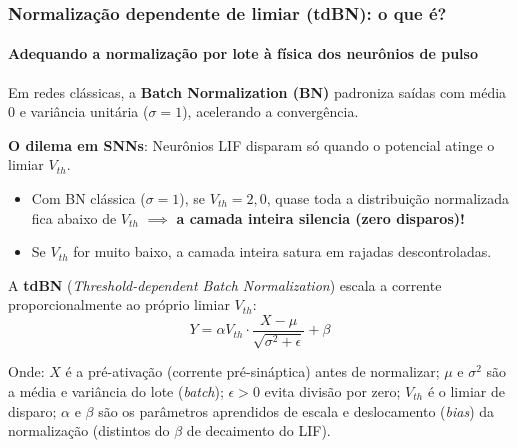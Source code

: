 \begin{frame}
	\frametitle{Normalização dependente de limiar (tdBN): o que é?}
	\framesubtitle{Adequando a normalização por lote à física dos neurônios de pulso}
	\small
	\par Em redes clássicas, a \textbf{Batch Normalization (BN)} padroniza saídas com média $0$ e variância unitária ($\sigma = 1$), acelerando a convergência.
	\par \textbf{O dilema em SNNs}: Neurônios LIF disparam só quando o potencial atinge o limiar $V_{th}$.
	\begin{itemize}
		\setlength{\itemsep}{1pt}
		\item Com BN clássica ($\sigma=1$), se $V_{th} = 2{,}0$, quase toda a distribuição normalizada fica abaixo de $V_{th}$ $\implies$ \textbf{a camada inteira silencia (zero disparos)!}
		\item Se $V_{th}$ for muito baixo, a camada inteira satura em rajadas descontroladas.
	\end{itemize}
	\par A \textbf{tdBN} (\textit{Threshold-dependent Batch Normalization}) escala a corrente proporcionalmente ao próprio limiar $V_{th}$:
	\[
		Y = \alpha V_{th} \cdot \frac{X - \mu}{\sqrt{\sigma^2 + \epsilon}} + \beta
	\]
	\par Onde: $X$ é a pré-ativação (corrente pré-sináptica) antes de normalizar; $\mu$ e $\sigma^2$ são a média e variância do lote (\textit{batch}); $\epsilon > 0$ evita divisão por zero; $V_{th}$ é o limiar de disparo; $\alpha$ e $\beta$ são os parâmetros aprendidos de escala e deslocamento (\textit{bias}) da normalização (distintos do $\beta$ de decaimento do LIF).
\end{frame}

